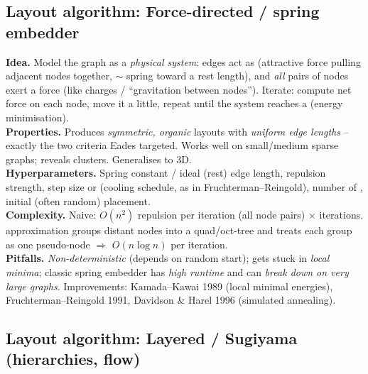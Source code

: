 \subsection{Layout algorithm: Force-directed / spring embedder}

\begin{algobox}
\textbf{Idea.} Model the graph as a \emph{physical system}: edges act as
 (attractive force pulling adjacent nodes together, $\sim$ spring
toward a rest length), and \emph{all} pairs of nodes exert a 
force (like charges / ``gravitation between nodes''). Iterate: compute net force
on each node, move it a little, repeat until the system reaches a
 (energy minimisation).\\[2pt]
\textbf{Properties.} Produces \emph{symmetric, organic} layouts with
\emph{uniform edge lengths} -- exactly the two criteria Eades targeted. Works
well on small/medium sparse graphs; reveals clusters. Generalises to 3D.\\[2pt]
\textbf{Hyperparameters.} Spring constant / ideal (rest) edge length, repulsion
strength, step size or  (cooling schedule, as in
Fruchterman--Reingold), number of , initial (often random)
placement.\\[2pt]
\textbf{Complexity.} Naive: $O(n^2)$ repulsion per iteration (all node pairs)
$\times$ iterations.  approximation groups distant nodes into a
quad/oct-tree and treats each group as one pseudo-node $\Rightarrow$
$O(n\log n)$ per iteration.\\[2pt]
\textbf{Pitfalls.} \emph{Non-deterministic} (depends on random start);
gets stuck in \emph{local minima}; classic spring embedder has \emph{high
runtime} and can \emph{break down on very large graphs}. Improvements:
Kamada--Kawai 1989 (local minimal energies), Fruchterman--Reingold 1991, Davidson
\& Harel 1996 (simulated annealing).
\end{algobox}

\subsection{Layout algorithm: Layered / Sugiyama (hierarchies, flow)}

